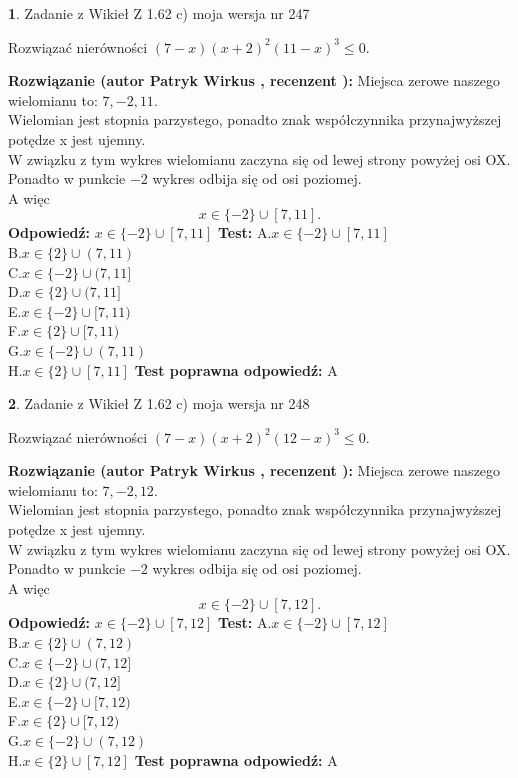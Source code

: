 \documentclass[12pt, a4paper]{article}
\theoremstyle{definition} %
\newtheorem{zad}{}
\newcommand{\zadStart}[1]{\begin{zad}#1\newline}
\newcommand{\zadStop}{\end{zad}}
\newcommand{\rozwStart}[2]{\noindent \textbf{Rozwiązanie (autor #1 , recenzent #2): }\newline}
\newcommand{\rozwStop}{\newline}
\newcommand{\odpStart}{\noindent \textbf{Odpowiedź:}\newline}
\newcommand{\odpStop}{\newline}
\newcommand{\testStart}{\noindent \textbf{Test:}\newline}
\newcommand{\testStop}{\newline}
\newcommand{\kluczStart}{\noindent \textbf{Test poprawna odpowiedź:}\newline}
\newcommand{\kluczStop}{\newline}
\begin{document}
\zadStart{Zadanie z Wikieł Z 1.62 c) moja wersja nr 247}

Rozwiązać nierówności $(7-x)(x+2)^{2}(11-x)^{3}\le0$.
\zadStop
\rozwStart{Patryk Wirkus}{}
Miejsca zerowe naszego wielomianu to: $7, -2, 11$.\\
Wielomian jest stopnia parzystego, ponadto znak współczynnika przy\linebreak najwyższej potędze x jest ujemny.\\ W związku z tym wykres wielomianu zaczyna się od lewej strony powyżej osi OX.\\
Ponadto w punkcie $-2$ wykres odbija się od osi poziomej.\\
A więc $$x \in \{-2\} \cup [7,11].$$
\rozwStop
\odpStart
$x \in \{-2\} \cup [7,11]$
\odpStop
\testStart
A.$x \in \{-2\} \cup [7,11]$\\
B.$x \in \{2\} \cup (7,11)$\\
C.$x \in \{-2\} \cup (7,11]$\\
D.$x \in \{2\} \cup (7,11]$\\
E.$x \in \{-2\} \cup [7,11)$\\
F.$x \in \{2\} \cup [7,11)$\\
G.$x \in \{-2\} \cup (7,11)$\\
H.$x \in \{2\} \cup [7,11]$
\testStop
\kluczStart
A
\kluczStop



\zadStart{Zadanie z Wikieł Z 1.62 c) moja wersja nr 248}

Rozwiązać nierówności $(7-x)(x+2)^{2}(12-x)^{3}\le0$.
\zadStop
\rozwStart{Patryk Wirkus}{}
Miejsca zerowe naszego wielomianu to: $7, -2, 12$.\\
Wielomian jest stopnia parzystego, ponadto znak współczynnika przy\linebreak najwyższej potędze x jest ujemny.\\ W związku z tym wykres wielomianu zaczyna się od lewej strony powyżej osi OX.\\
Ponadto w punkcie $-2$ wykres odbija się od osi poziomej.\\
A więc $$x \in \{-2\} \cup [7,12].$$
\rozwStop
\odpStart
$x \in \{-2\} \cup [7,12]$
\odpStop
\testStart
A.$x \in \{-2\} \cup [7,12]$\\
B.$x \in \{2\} \cup (7,12)$\\
C.$x \in \{-2\} \cup (7,12]$\\
D.$x \in \{2\} \cup (7,12]$\\
E.$x \in \{-2\} \cup [7,12)$\\
F.$x \in \{2\} \cup [7,12)$\\
G.$x \in \{-2\} \cup (7,12)$\\
H.$x \in \{2\} \cup [7,12]$
\testStop
\kluczStart
A
\kluczStop
\end{document}
